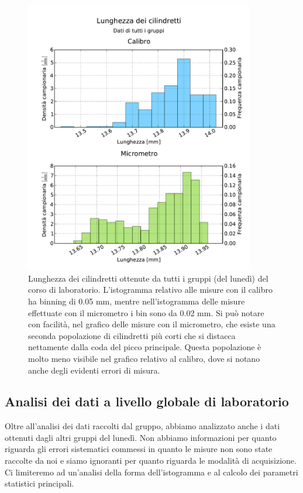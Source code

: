 \begin{figure}
	\centering
	\includegraphics[width=100mm]{grafici/cilindri_tutti_2.pdf}
    \caption{Lunghezza dei cilindretti ottenute da tutti i gruppi (del lunedì)
        del corso di laboratorio. L'istogramma relativo alle misure con il calibro
        ha binning di 0.05 mm, mentre nell'istogramma delle misure effettuate con
        il micrometro i bin sono da 0.02 mm. Si può notare con facilità, nel grafico
        delle misure con il micrometro, che esiste una seconda popolazione di
        cilindretti più corti che si distacca nettamente dalla coda del picco principale.
        Questa popolazione è molto meno visibile nel grafico relativo al calibro, dove si
        notano anche degli evidenti errori di misura.}
    \label{fig:calmic_tutti}
\end{figure}

\subsection{Analisi dei dati a livello globale di laboratorio}

Oltre all'analisi dei dati raccolti dal gruppo, abbiamo analizzato anche i dati
ottenuti dagli altri gruppi del lunedì. Non abbiamo informazioni per quanto riguarda
gli errori sistematici commessi in quanto le misure non sono state raccolte
da noi e siamo ignoranti per quanto riguarda le modalità di acquisizione.
Ci limiteremo ad un'analisi della forma dell'istogramma e al calcolo dei parametri
statistici principali.

